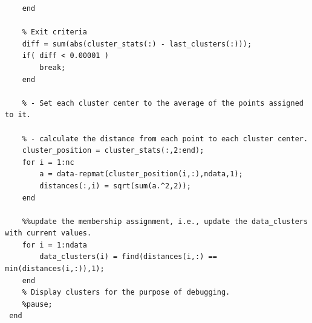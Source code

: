\documentclass{article}
\begin{document}
\begin{lstlisting}
    end
    
    % Exit criteria
    diff = sum(abs(cluster_stats(:) - last_clusters(:)));
    if( diff < 0.00001 )
        break;
    end
    
    % - Set each cluster center to the average of the points assigned to it.
    
    % - calculate the distance from each point to each cluster center.  
    cluster_position = cluster_stats(:,2:end); 
    for i = 1:nc
        a = data-repmat(cluster_position(i,:),ndata,1);
        distances(:,i) = sqrt(sum(a.^2,2));
    end
    
	%%update the membership assignment, i.e., update the data_clusters with current values.  
    for i = 1:ndata
        data_clusters(i) = find(distances(i,:) == min(distances(i,:)),1);
    end
    % Display clusters for the purpose of debugging.  
    %pause;
 end 

\end{lstlisting}
\end{document}
